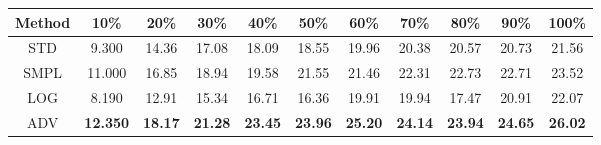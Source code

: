 \documentclass{standalone}
\begin{document}
\begin{tabular}{c|cccccccccc}
      \toprule
      Method & 10\% & 20\% & 30\% & 40\% & 50\% & 60\% & 70\% & 80\% & 90\% & 100\% \\
      \midrule
STD & 9.300 & 14.36 & 17.08 & 18.09 & 18.55 & 19.96 & 20.38 & 20.57 & 20.73 & 21.56\\
SMPL & 11.000 & 16.85 & 18.94 & 19.58 & 21.55 & 21.46 & 22.31 & 22.73 & 22.71 & 23.52\\
LOG & 8.190 & 12.91 & 15.34 & 16.71 & 16.36 & 19.91 & 19.94 & 17.47 & 20.91 & 22.07\\
ADV & \textbf{12.350} & \textbf{18.17} & \textbf{21.28} & \textbf{23.45} & \textbf{23.96} & \textbf{25.20} & \textbf{24.14} & \textbf{23.94} & \textbf{24.65} & \textbf{26.02}\\
  \bottomrule
\end{tabular}
\end{document}
